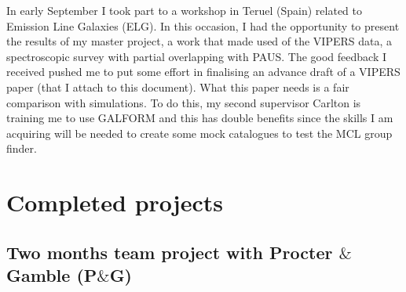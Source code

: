 \documentclass[letterpaper]{article}
\begin{document}
In early September I took part to a workshop in Teruel (Spain) related to Emission Line Galaxies (ELG). In this occasion, I had the opportunity to present the results of my master project, a work that made used of the VIPERS data, a spectroscopic survey with partial overlapping with PAUS. The good feedback I received pushed me to put some effort in finalising an advance draft of a VIPERS paper (that I attach to this document). What this paper needs is a fair comparison with simulations. To do this, my second supervisor Carlton is training me to use GALFORM and this has double benefits since the skills I am acquiring will be needed to create some mock catalogues to test the MCL group finder.


\section{Completed projects}
\subsection{Two months team project with Procter $\&$ Gamble (P$\&$G)}
\end{document}
